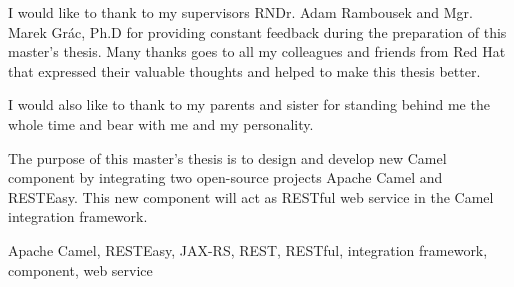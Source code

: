 \documentclass[12pt,final,oneside]{fithesis2}
\begin{document}
\FrontMatter
\ThesisTitlePage

\begin{ThesisDeclaration}
  \DeclarationText
  \AdvisorName
\end{ThesisDeclaration}

\begin{ThesisThanks}
I would like to thank to my supervisors RNDr. Adam Rambousek and Mgr. Marek Grác, Ph.D
for providing constant feedback during the preparation of this master’s
thesis. Many thanks goes to all my colleagues and friends from Red Hat that
expressed their valuable thoughts and helped to make this thesis better.

I would also like to thank to my parents and sister for standing behind me the whole time and bear with me and my personality.
\end{ThesisThanks}

\begin{ThesisAbstract}
The purpose of this master’s thesis is to design and develop new Camel
component by integrating two open-source projects Apache Camel and
RESTEasy. This new component will act as RESTful web service in
the Camel integration framework.
\end{ThesisAbstract}

\begin{ThesisKeyWords}
Apache Camel, RESTEasy, JAX-RS, REST, RESTful, integration framework, component, web service

\end{ThesisKeyWords}

\MainMatter

\tableofcontents

\end{document}
